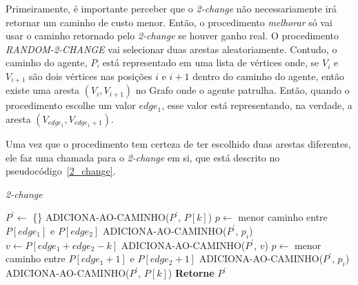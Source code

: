 Primeiramente, é importante perceber que o \textit{2-change} não necessariamente 
irá retornar um caminho de custo menor. Então, o procedimento \textit{melhorar} 
só vai usar o caminho retornado pelo \textit{2-change} se houver ganho real. O 
procedimento \textit{RANDOM-2-CHANGE} vai selecionar duas arestas aleatoriamente. 
Contudo, o caminho do agente, $P$, está representado em uma lista de vértices 
onde, se $V_{i}$ e $V_{i+1}$ são dois vértices nas posições $i$ e $i+1$ dentro do 
caminho do agente, então existe uma aresta $(V_{i}, V_{i+1})$ no Grafo onde o 
agente patrulha. Então, quando o procedimento escolhe um valor $edge_{1}$, esse 
valor está representando, na verdade, a aresta $(V_{edge_{1}}, V_{edge_{1}+1})$.

Uma vez que o procedimento tem certeza de ter escolhido duas arestas diferentes, 
ele faz uma chamada para o \textit{2-change} em si, que está descrito no 
pseudocódigo~\ref{2_change}.

\begin{algorithm}                  %
	\caption{\textit{2-change}}          %
	\label{2_change}                           %
	\begin{algorithmic}[1]                    %
		\newline
		\State $P^{\prime}  \gets $ \{\} 
		 
				\State ADICIONA-AO-CAMINHO($P^{\prime}$, $P[k]$) 
				\State $p \gets $ menor caminho entre $P[edge_{1}]$ e $P[edge_{2}]$
					\State ADICIONA-AO-CAMINHO($P^{\prime}$, $p_{i}$)
				\EndFor
				\State $v \gets P[edge_{1} + edge_{2} - k]$ 
				\State ADICIONA-AO-CAMINHO($P^{\prime}$, $v$)
				\State $p \gets $ menor caminho entre $P[edge_{1}+1]$ e $P[edge_{2}+1]$
					\State ADICIONA-AO-CAMINHO($P^{\prime}$, $p_{i}$)
				\EndFor
			\Else
				\State ADICIONA-AO-CAMINHO($P^{\prime}$, $P[k]$)
			\EndIf
		\EndFor
		\State \textbf{Retorne} $P^{\prime}$
		\EndProcedure
	\end{algorithmic}
\end{algorithm}

